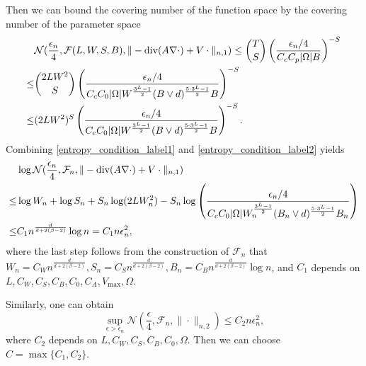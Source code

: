\documentclass{article}
\newcommand{\F}{\mathcal{F}}
\newcommand{\N}{\mathcal{N}}
\renewcommand{\div}{\textnormal{div}}
\theoremstyle{plain}
\theoremstyle{definition}
\theoremstyle{remark}
\begin{document}
Then we can bound the covering number of the function space by the covering number of the parameter space 
\begin{equation} \label{entropy_condition_label2}
    \begin{aligned}
    & \N(\frac{\epsilon_n}{4}, \F(L, W, S, B), \|-\div (A \nabla\cdot) + V \cdot \|_{n, 1}) \leq \binom{T}{S} \left(\frac{\epsilon_{n} / 4}{C_c C_p  |\Omega| B}\right)^{-S} \\ \leq & \binom{2LW^2}{S} \left(\frac{\epsilon_{n} / 4}{C_c  C_0 |\Omega| W^{\frac{3^{L}-1}{2}} (B \vee d)^{\frac{5 \cdot 3^{L}-1}{2}} B}\right)^{-S} \\
     \leq & (2 L W^2)^S \left(\frac{\epsilon_{n} / 4}{C_c C_0 |\Omega| W^{\frac{3^{L}-1}{2}} (B \vee d)^{\frac{5 \cdot 3^{L}-1}{2}} B}\right)^{-S}. 
\end{aligned}
\end{equation}
Combining \eqref{entropy_condition_label1} and \eqref{entropy_condition_label2} yields 
\begin{equation*}
\begin{aligned}
    & \log \N(\frac{\epsilon_n}{4}, \F_n, \|-\div (A \nabla\cdot) + V \cdot \|_{n, 1}) \\
    \leq & \log W_n + \log S_n + S_n \log (2 L W_n^2) - S_n \log \left(\frac{\epsilon_{n} / 4}{C_c C_0 |\Omega| W_n^{\frac{3^{L}-1}{2}} (B_n \vee d)^{\frac{5 \cdot 3^{L}-1}{2}} B_n}\right) \\
    \leq & C_1 n^{\frac{d}{d + 2(\beta-2)}} \log n = C_1 n \epsilon_n^2 ,
\end{aligned}
\end{equation*}
where the last step follows from the construction of $\F_n$ that $W_n = C_W n^{\frac{d}{d + 2(\beta-2)}}, S_n = C_S n^{\frac{d}{d + 2(\beta-2)}}, B_n = C_B n^{\frac{d}{d + 2(\beta-2)}} \log n$, and $C_1$ depends on $L, C_W, C_S, C_B, C_0, C_A, V_{\text{max}}, \Omega$. 

Similarly, one can obtain 
\begin{equation*}
    \sup_{\epsilon > \epsilon_n} \N(\frac{\epsilon}{4}, \F_n, \|\cdot\|_{n, 2}) \leq C_2 n \epsilon_n^2,
\end{equation*}
where $C_2$ depends on $L, C_W, C_S, C_B, C_0, \Omega$. Then we can choose $C = \max\{C_1, C_2\}$. 
\end{document}
